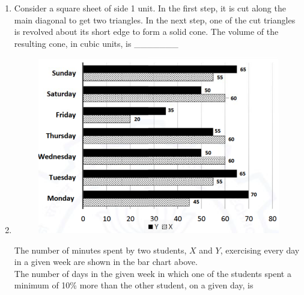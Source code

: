 \documentclass[journal]{IEEEtran}
\begin{document}
\begin{enumerate}[start=1]
\item Consider a square sheet of side 1 unit. In the first step, it is cut along the main diagonal to get two triangles. In the next step, one of the cut triangles is revolved about its short edge to form a solid cone. The volume of the resulting cone, in cubic units, is \_\_\_\_\_\_\_
\hfill{}
\begin{enumerate}
\end{enumerate}

\item 
\begin{figure}[H]
    \centering
    \includegraphics[width=0.5\columnwidth]{figs/image(q9).png}
\end{figure}
The number of minutes spent by two students, $X$ and $Y$, exercising every day in a given week are shown in the bar chart above.\\
The number of days in the given week in which one of the students spent a minimum of 10\% more than the other student, on a given day, is
\hfill{}
\begin{enumerate}
\end{enumerate}


\end{enumerate}
\end{document}
